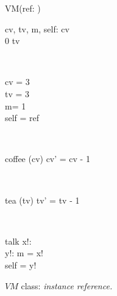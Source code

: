 \begin{figure}[H]
\centering
\begin{class}{VM(ref: \integer)}
\\
\begin{state}
cv, tv, m, self: \integer
{} \leq  cv 
\\
0 \leq  tv 
\end{state} 
\\
\begin{init}
cv = 3
\\tv = 3
\\ m= 1
\\self = ref
\end{init} 
\\
\begin{op}{coffee}
\Delta (cv)
\ST
cv' = cv - 1
\end{op}
\\
\begin{op}{tea}
\Delta (tv)
\ST
tv' = tv - 1
\end{op}
\\
\begin{op}{talk}
x!: \integer
\\y!: \integer
\ST
m = x!
\\self = y!
\end{op}
\end{class}
\caption{$VM$ class: \textit{instance reference.}}
\label{oz_vm_reference_name}
\end{figure}